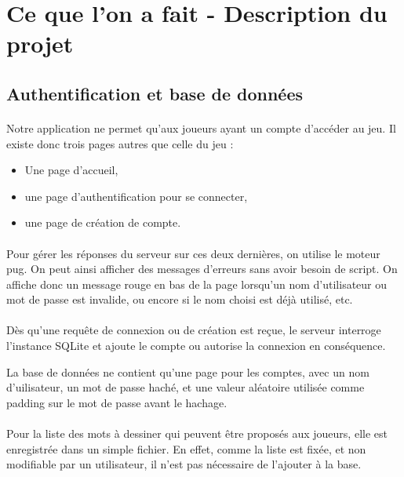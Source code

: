 \documentclass[11pt,a4paper]{article}
\begin{document}
    \section{Ce que l'on a fait - Description du projet}
        \subsection{Authentification et base de données}
            \paragraph{}
            Notre application ne permet qu'aux joueurs ayant un compte d'accéder au jeu.
            Il existe donc trois pages autres que celle du jeu :
            \begin{itemize}
                \item Une page d'accueil,
                \item une page d'authentification pour se connecter,
                \item une page de création de compte.
            \end{itemize}
            \paragraph{}
            Pour gérer les réponses du serveur sur ces deux dernières,
            on utilise le moteur pug.
            On peut ainsi afficher des messages d'erreurs sans avoir besoin de script.
            On affiche donc un message rouge en bas de la page lorsqu'un nom d'utilisateur ou mot de passe est invalide,
            ou encore si le nom choisi est déjà utilisé, etc.
            \paragraph{}
            Dès qu'une requête de connexion ou de création est reçue,
            le serveur interroge l'instance SQLite et ajoute le compte ou autorise la connexion en conséquence.

            La base de données ne contient qu'une page pour les comptes, avec un nom d'uilisateur, un mot de passe haché,
            et une valeur aléatoire utilisée comme padding sur le mot de passe avant le hachage.
            \paragraph{}
            Pour la liste des mots à dessiner qui peuvent être proposés aux joueurs,
            elle est enregistrée dans un simple fichier.
            En effet, comme la liste est fixée, et non modifiable par un utilisateur,
            il n'est pas nécessaire de l'ajouter à la base.
\end{document}
